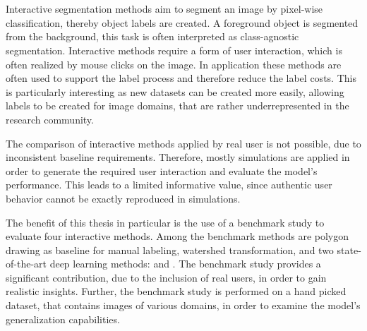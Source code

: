 \chapter{\abstractname}



Interactive segmentation methods aim to segment an image by pixel-wise classification, thereby object labels are created.
A foreground object is segmented from the background, this task is often interpreted as class-agnostic segmentation.
Interactive methods require a form of user interaction, which is often realized by mouse clicks on the image. 
In application these methods are often used to support the label process and therefore reduce the label costs.
This is particularly interesting as new datasets can be created more easily, allowing labels to be created for image domains, that are rather underrepresented in the research community.

The comparison of interactive methods applied by real user is not possible, due to inconsistent baseline requirements.
Therefore, mostly simulations are applied in order to generate the required user interaction and evaluate the model's performance.
This leads to a limited informative value, since authentic user behavior cannot be exactly reproduced in simulations.

The benefit of this thesis in particular is the use of a benchmark study to evaluate four interactive methods.
Among the benchmark methods are polygon drawing as baseline for manual labeling, watershed transformation, and two state-of-the-art deep learning methods:  and .
The benchmark study provides a significant contribution, due to the inclusion of real users, in order to gain realistic insights.
Further, the benchmark study is performed on a hand picked dataset, that contains images of various domains, in order to examine the model's generalization capabilities.


